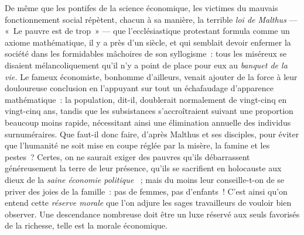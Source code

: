 \documentclass[french,twoside]{book} %
\begin{document}
De même que les pontifes de la science économique, les victimes du mauvais fonctionnement social répètent, chacun à sa manière, la terrible \emph{loi de Malthus} — « Le pauvre est de trop » — que l’ecclésiastique protestant formula comme un axiome mathématique, il y a près d’un siècle, et qui semblait devoir enfermer la société dans les formidables mâchoires de son syllogisme : tous les miséreux se disaient mélancoliquement qu’il n’y a point de place pour eux au \emph{banquet de la vie.}  Le fameux économiste, bonhomme d’ailleurs, venait ajouter de la force à leur douloureuse conclusion en l’appuyant sur tout un échafaudage d’apparence mathématique : la population, dit-il, doublerait normalement de vingt-cinq en vingt-cinq ans, tandis que les subsistances s’accroîtraient suivant une proportion beaucoup moins rapide, nécessitant ainsi une élimination annuelle des individus surnuméraires. Que faut-il donc faire, d’après Malthus et ses disciples, pour éviter que l’humanité ne soit mise en coupe réglée par la misère, la famine et les pestes ? Certes, on ne saurait exiger des pauvres qu’ils débarrassent généreusement la terre de leur présence, qu’ils se sacrifient en holocauste aux dieux de la \emph{saine économie politique}  ; mais du moins leur conseille-t-on de se priver des joies de la famille : pas de femmes, pas d’enfants ! C’est ainsi qu’on entend cette \emph{réserve morale} que l’on adjure les sages travailleurs de vouloir bien observer. Une descendance nombreuse doit être un luxe réservé aux seuls favorisés de la richesse, telle est la morale économique.\par
\end{document}
